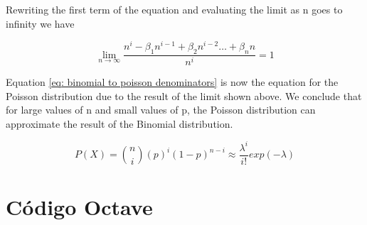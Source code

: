 \documentclass[a4paper,12pt]{article}
\begin{document}
 Rewriting the first term of the equation and evaluating the limit as n goes to infinity we have

 \begin{equation}
\lim_{n\to\infty}  \dfrac{n^i - \beta_1 n^{i-1} + \beta_2 n^{i-2} \dots +  \beta_n n}{n^i} = 1
 \end{equation}

 Equation \eqref{eq: binomial to poisson denominators} is now the equation for the Poisson distribution due to the result of the limit shown above.
 We conclude that for large values of n and small values of p, the Poisson distribution can approximate the result of the Binomial distribution.

 \begin{equation}
  P(X) = \binom n i (p)^i (1-p)^{n-i} \approx \dfrac{\lambda ^i}{i!} exp(-\lambda)
 \end{equation}


\printbibliography

\pagebreak
\appendix
\section{Código Octave}

\end{document}
